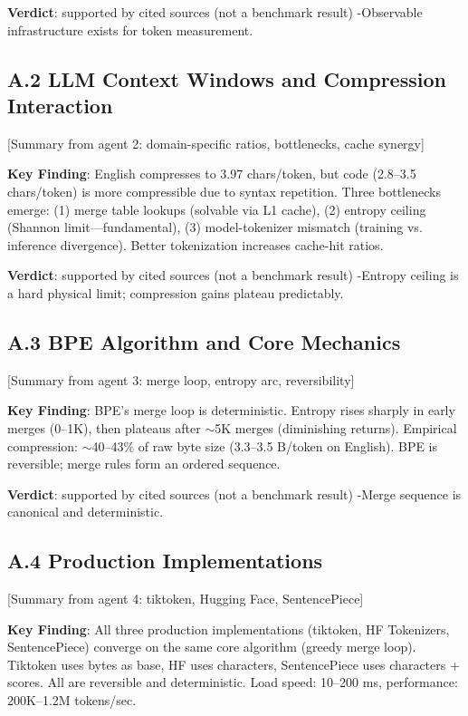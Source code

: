\documentclass[11pt,oneside]{article}
\begin{document}
\textbf{Verdict}: supported by cited sources (not a benchmark result) -Observable infrastructure exists for token measurement.

\subsection{A.2 LLM Context Windows and Compression Interaction}

[Summary from agent 2: domain-specific ratios, bottlenecks, cache synergy]

\textbf{Key Finding}: English compresses to 3.97 chars/token, but code (2.8--3.5 chars/token) is more compressible due to syntax repetition. Three bottlenecks emerge: (1) merge table lookups (solvable via L1 cache), (2) entropy ceiling (Shannon limit---fundamental), (3) model-tokenizer mismatch (training vs. inference divergence). Better tokenization increases cache-hit ratios.

\textbf{Verdict}: supported by cited sources (not a benchmark result) -Entropy ceiling is a hard physical limit; compression gains plateau predictably.

\subsection{A.3 BPE Algorithm and Core Mechanics}

[Summary from agent 3: merge loop, entropy arc, reversibility]

\textbf{Key Finding}: BPE's merge loop is deterministic. Entropy rises sharply in early merges (0--1K), then plateaus after $\sim$5K merges (diminishing returns). Empirical compression: $\sim$40--43\% of raw byte size (3.3--3.5 B/token on English). BPE is reversible; merge rules form an ordered sequence.

\textbf{Verdict}: supported by cited sources (not a benchmark result) -Merge sequence is canonical and deterministic.

\subsection{A.4 Production Implementations}

[Summary from agent 4: tiktoken, Hugging Face, SentencePiece]

\textbf{Key Finding}: All three production implementations (tiktoken, HF Tokenizers, SentencePiece) converge on the same core algorithm (greedy merge loop). Tiktoken uses bytes as base, HF uses characters, SentencePiece uses characters + scores. All are reversible and deterministic. Load speed: 10--200 ms, performance: 200K--1.2M tokens/sec.
\end{document}
